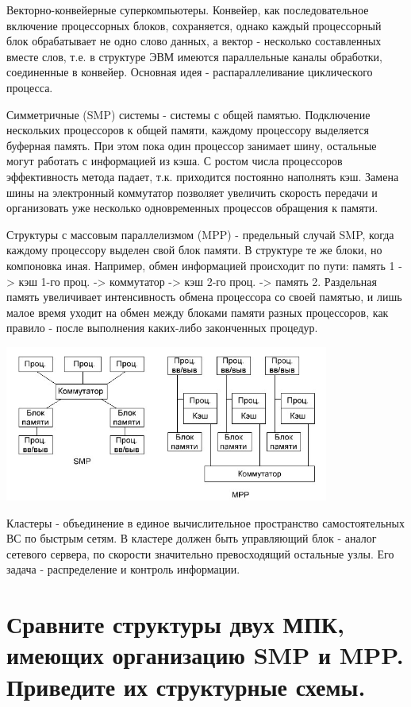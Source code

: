 \documentclass[unicode, 12pt, a4paper, oneside]{article}
\begin{document}
Векторно-конвейерные суперкомпьютеры. Конвейер, как последовательное включение процессорных блоков, сохраняется, однако каждый процессорный блок обрабатывает не одно слово данных, а вектор - несколько составленных вместе слов, т.е. в структуре ЭВМ имеются параллельные каналы обработки, соединенные в конвейер. Основная идея - распараллеливание циклического процесса.

Симметричные (SMP) системы - системы с общей памятью. Подключение нескольких процессоров к общей памяти, каждому процессору выделяется буферная память. При этом пока один процессор занимает шину, остальные могут работать с информацией из кэша. С ростом числа процессоров эффективность метода падает, т.к. приходится постоянно наполнять кэш. Замена шины на электронный коммутатор позволяет увеличить скорость передачи и организовать уже несколько одновременных процессов обращения к памяти. 

Структуры с массовым параллелизмом (MPP) - предельный случай SMP, когда каждому процессору выделен свой блок памяти. В структуре те же блоки, но компоновка иная. Например, обмен информацией происходит по пути: память 1 -> кэш 1-го проц. -> коммутатор -> кэш 2-го проц. -> память 2. Раздельная память увеличивает интенсивность обмена процессора со своей памятью, и лишь малое время уходит на обмен между блоками памяти разных процессоров, как правило - после выполнения каких-либо законченных процедур.

\begin{center}
\includegraphics[width=0.8\textwidth]{117_SMP_MPP.png}\\
\end{center}
Кластеры - объединение в единое вычислительное пространство самостоятельных ВС по быстрым сетям. В кластере должен быть управляющий блок - аналог сетевого сервера, по скорости значительно превосходящий остальные узлы. Его задача - распределение и контроль информации.

\section{Сравните структуры двух МПК, имеющих организацию SMP и MPP. Приведите их структурные схемы.}
\end{document}
